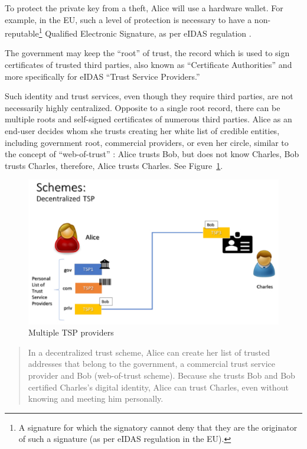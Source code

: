 \begin{multicols}{2}
To protect the private key from a theft, Alice will use a hardware wallet. For example, in the EU, such a level of protection is necessary to have a non-reputable\footnote{A signature for which the signatory cannot deny that they are the originator of such a signature (as per eIDAS regulation in the EU).} Qualified Electronic Signature, as per eIDAS regulation \cite{art1-key43}.

The government may keep the “root” of trust, the record which is used to sign certificates of trusted third parties, also known as “Certificate Authorities” and more specifically for eIDAS “Trust Service Providers.”

Such identity and trust services, even though they require third parties, are not necessarily highly centralized. Opposite to a single root record, there can be multiple roots and self-signed certificates of numerous third parties. Alice as an end-user decides whom she trusts creating her white list of credible entities, including government root, commercial providers, or even her circle, similar to the concept of “web-of-trust” \cite{art1-key44}: Alice trusts Bob, but does not know Charles, Bob trusts Charles, therefore, Alice trusts Charles. See Figure~\ref{chap1-fig09}.
\begin{figure}[H]
\centering
\includegraphics[scale=1.65]{src/Figures/chap1/chap1-fig09.jpg}
\caption{Multiple TSP providers}\label{chap1-fig09}
\end{figure}

\begin{quote}
In a decentralized trust scheme, Alice can create her list of trusted addresses that belong to the government, a commercial trust service provider and Bob (web-of-trust scheme). Because she trusts Bob and Bob certified Charles’s digital identity, Alice can trust Charles, even without knowing and meeting him personally.
\end{quote}


\end{multicols}

